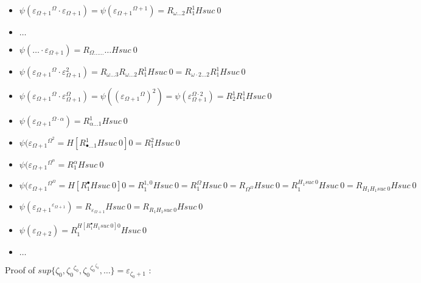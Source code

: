 \documentclass[10pt]{article}
\begin{document}
\begin{itemize}
\item \( \psi({\varepsilon_{\Omega+1}}^\Omega \cdot \varepsilon_{\Omega+1}) = \psi({\varepsilon_{\Omega+1}}^{\Omega+1}) = R_{\omega \ldots 2} R^1_1 H suc\ 0 \)

\item \( \ldots \)

\item \( \psi(\ldots \cdot \varepsilon_{\Omega+1}) = R_{\Omega \ldots \ldots} \ldots H suc\ 0 \)

\item \( \psi({\varepsilon_{\Omega+1}}^\Omega \cdot \varepsilon_{\Omega+1}^2) = R_{\omega \ldots 3} R_{\omega \ldots 2} R^1_1 H suc\ 0 = R_{\omega \cdot 2 \ldots 2} R^1_1 H suc\ 0 \)

\item \( \psi({\varepsilon_{\Omega+1}}^\Omega \cdot \varepsilon_{\Omega+1}^\Omega) = \psi(({\varepsilon_{\Omega+1}}^\Omega)^2) = \psi(\varepsilon_{\Omega+1}^{\Omega \cdot 2}) = R^1_2 R^1_1 H suc\ 0 \)

\item \( \psi({\varepsilon_{\Omega+1}}^{\Omega \cdot \alpha}) = R^1_{\alpha \ldots 1} H suc\ 0 \)

\item \( \psi({\varepsilon_{\Omega+1}}^{\Omega^2} = H [R^1_{\bullet \ldots 1} H suc\ 0] 0 = R^2_1 H suc\ 0 \)

\item \( \psi({\varepsilon_{\Omega+1}}^{\Omega^\alpha} = R^\alpha_1 H suc\ 0 \)

\item \( \psi({\varepsilon_{\Omega+1}}^{\Omega^\Omega} = H [R^\bullet_1 H suc\ 0] 0 = R^{1,0}_1 H suc\ 0 = R^\Omega_1 H suc\ 0 = R_{\Omega^\Omega} H suc\ 0 = R^{H_1 suc\ 0}_1 H suc\ 0 = R_{H_1 H_1 suc\ 0} H suc\ 0 \)

\item \( \psi({\varepsilon_{\Omega+1}}^{\varepsilon_{\Omega+1}}) = R_{\varepsilon_{\Omega+1}} H suc\ 0 = R_{R_1 H_1 suc\ 0} H suc\ 0 \)

\item \( \psi({\varepsilon_{\Omega+2}}) = R^{H [R^\bullet_1 H_1 suc\ 0] 0}_1 H suc\ 0 \)

\item \( \ldots \)

\end{itemize}

Proof of \( sup \lbrace \zeta_0, {\zeta_0}^{\zeta_0}, {\zeta_0}^{{\zeta_0}^{\zeta_0}}, \ldots \rbrace = \varepsilon_{\zeta_0+1} \) :
\end{document}
